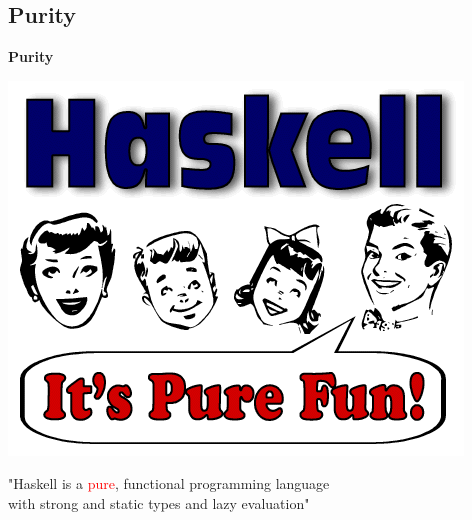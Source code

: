 \documentclass[unknownkeysallowed]{beamer}
\begin{document}

\subsection{Purity}
\begin{frame}

    \begin{center}
    \Large\textbf{Purity} \bigskip
    
    \includegraphics[scale=0.25]{PureFun.png} 
    \end{center}

\end{frame}


\begin{frame}
\begin{center}

  "Haskell is a \textcolor{red}{pure}, functional programming language \\ with strong and static types and lazy evaluation"
  
\end{center}
\end{frame}

\end{document}
